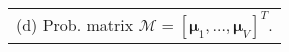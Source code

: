 \scriptsize
\begin{tabular}[t]{l}
 (d) Prob. matrix \tiny $\mathcal{M}=[\bm{\mu}_1,\ldots, \bm{\mu}_V]^T.$
\end{tabular}